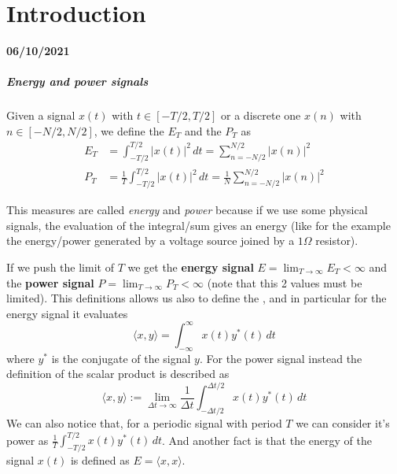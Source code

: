 \chapter{Introduction}

	\textbf{06/10/2021}
	
	\paragraph{Energy and power signals} Given a signal $x(t)$ with $t\in [-T/2, T/2]$ or a discrete one $x(n)$ with $n \in [-N/2,N/2]$, we define the  $E_T$ and the  $P_T$ as
	\begin{equation}
	\begin{split}		
		E_T & = \int_{-T/2}^{T/2} |x(t)|^2 \, dt = \sum_{n=-N/2}^{N/2} |x(n)|^2 \\
		P_T & = \frac 1 T\int_{-T/2}^{T/2} |x(t)|^2 \, dt = \frac 1 N \sum_{n=-N/2}^{N/2} |x(n)|^2
	\end{split}
	\end{equation}
	
	This measures are called \textit{energy} and \textit{power} because if we use some physical signals, the evaluation of the integral/sum gives an energy (like for the example the energy/power generated by a voltage source joined by a $1\Omega$ resistor). 
	
	If we push the limit of $T$ we get the \textbf{energy signal} $E = \lim_{T\rightarrow \infty} E_T < \infty$ and the \textbf{power signal} $P = \lim_{T\rightarrow \infty} P_T < \infty$ (note that this 2 values must be limited). This definitions allows us also to define the , and in particular for the energy signal it evaluates
	\begin{equation}
		\langle x,y\rangle = \int_{-\infty}^\infty x(t) y^*(t)\, dt
	\end{equation}
	where $y^*$ is the conjugate of the signal $y$. For the power signal instead the definition of the scalar product is described as
	\begin{equation}
		\langle x, y\rangle := \lim_{\Delta t \rightarrow \infty} \frac{1}{\Delta t} \int_{-\Delta t/2}^{\Delta t/2} x(t)y^*(t) \, dt
	\end{equation}
	We can also notice that, for a periodic signal with period $T$ we can consider it's power as $ \frac{1}{T} \int_{-T/2}^{T/2} x(t)y^*(t) \, dt$. And another fact is that the energy of the signal $x(t)$ is defined as $E= \langle x,x \rangle$.
	